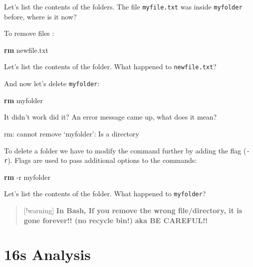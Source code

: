 \documentclass[
]{book}
\newenvironment{Shaded}{\begin{snugshade}}{\end{snugshade}}
\newcommand{\AttributeTok}[1]{\textcolor[rgb]{0.13,0.29,0.53}{#1}}
\newcommand{\ExtensionTok}[1]{#1}
\newcommand{\FunctionTok}[1]{\textcolor[rgb]{0.13,0.29,0.53}{\textbf{#1}}}
\newcommand{\NormalTok}[1]{#1}
\begin{document}
Let's list the contents of the folders. The file \texttt{myfile.txt} was inside \texttt{myfolder} before, where is it now?

To remove files :

\begin{Shaded}
\begin{Highlighting}[]
\FunctionTok{rm}\NormalTok{ newfile.txt}
\end{Highlighting}
\end{Shaded}

Let's list the contents of the folder. What happened to \texttt{newfile.txt}?

And now let's delete \texttt{myfolder}:

\begin{Shaded}
\begin{Highlighting}[]
\FunctionTok{rm}\NormalTok{ myfolder}
\end{Highlighting}
\end{Shaded}

It didn't work did it? An error message came up, what does it mean?

\begin{Shaded}
\begin{Highlighting}[]
\ExtensionTok{rm:}\NormalTok{ cannot remove ‘myfolder’: Is a directory}
\end{Highlighting}
\end{Shaded}

To delete a folder we have to modify the command further by adding the flag (\texttt{-r}). Flags are used to pass additional options to the commands:

\begin{Shaded}
\begin{Highlighting}[]
\FunctionTok{rm} \AttributeTok{{-}r}\NormalTok{ myfolder}
\end{Highlighting}
\end{Shaded}

Let's list the contents of the folder. What happened to \texttt{myfolder}?

\begin{quote}
{[}!warning{]}
\textbf{In Bash, If you remove the wrong file/directory, it is gone forever!! (no recycle bin!)}
\textbf{aka BE CAREFUL!!}
\end{quote}

\chapter{16s Analysis}\label{s-analysis}
\end{document}
